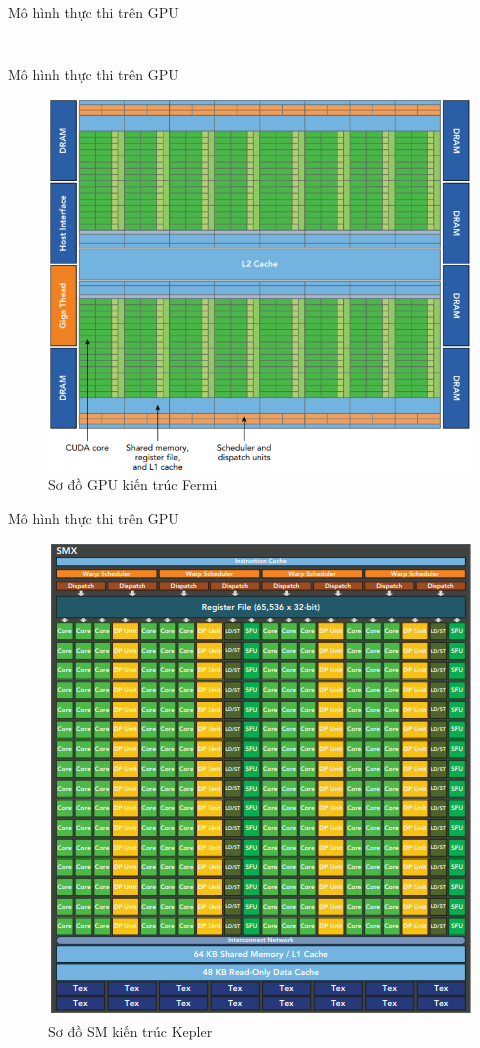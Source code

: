 \documentclass[10pt]{beamer}
\theoremstyle{remark}
\numberwithin{algocf}{section}
\numberwithin{equation}{section}
\numberwithin{dl}{section}
\numberwithin{figure}{section}
\begin{document}
\begin{frame}{Mô hình thực thi trên GPU}
\begin{columns}[onlytextwidth]
\begin{column}{0.5\linewidth}
\begin{figure}[H]
            \end{figure}
        \end{column}
    \end{columns}
\end{frame}

\begin{frame}{Mô hình thực thi trên GPU}
    \begin{figure}[H]
        \centering
        \includegraphics[width=0.65\linewidth]{figures/CUDA/Fermi_Architecture.png}
        \caption{Sơ đồ GPU kiến trúc Fermi}
    \end{figure}
\end{frame}

\begin{frame}{Mô hình thực thi trên GPU}
    \begin{figure}[H]
        \centering
        \includegraphics[width=0.45\linewidth]{figures/CUDA/SM_Kepler_Architecture.png}
        \caption{Sơ đồ SM kiến trúc Kepler}
    \end{figure}
\end{frame}
\end{document}
